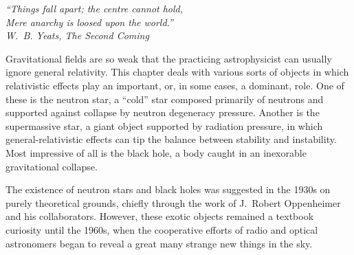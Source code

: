 
\begin{flushright}
\begin{minipage}{0.46\textwidth}
\itshape
``Things fall apart; the centre cannot hold,\\
Mere anarchy is loosed upon the world.''\\
W.~B. Yeats, \emph{The Second Coming}
\end{minipage}
\end{flushright}

Gravitational fields are so weak that the practicing astrophysicist can
usually ignore general relativity. This chapter deals with various sorts of
objects in which relativistic effects play an important, or, in some cases, a
dominant, role. One of these is the neutron star, a ``cold'' star composed
primarily of neutrons and supported against collapse by neutron degeneracy
pressure. Another is the supermassive star, a giant object supported by
radiation pressure, in which general-relativistic effects can tip the balance
between stability and instability. Most impressive of all is the black hole,
a body caught in an inexorable gravitational collapse.

The existence of neutron stars and black holes was suggested in the 1930s on
purely theoretical grounds, chiefly through the work of J.~Robert Oppenheimer
and his collaborators. However, these exotic objects remained a textbook
curiosity until the 1960s, when the cooperative efforts of radio and optical
astronomers began to reveal a great many strange new things in the sky.

